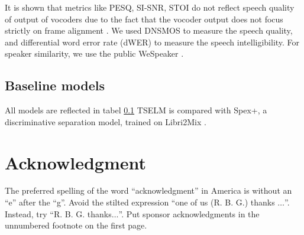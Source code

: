 \documentclass[conference]{IEEEtran}
\begin{document}
It is shown that metrics like PESQ, SI-SNR, STOI do not reflect speech quality of output of 
vocoders due to the fact that the vocoder output does not focus strictly on frame alignment
\cite{tokensplit,selm}. We used DNSMOS \cite{dnsmos} to measure the speech quality, and differential 
word error 
rate (dWER) \cite{dwer} to measure the speech intelligibility. For speaker similarity, we use the 
public WeSpeaker \cite{wespeaker}.


\subsection{Baseline models}
All models are reflected in tabel \ref{}
TSELM is compared with Spex+, a discriminative separation model, \cite{spex_plus} trained on Libri2Mix \cite{librimix}. 



\section*{Acknowledgment}

The preferred spelling of the word ``acknowledgment'' in America is without 
an ``e'' after the ``g''. Avoid the stilted expression ``one of us (R. B. 
G.) thanks $\ldots$''. Instead, try ``R. B. G. thanks$\ldots$''. Put sponsor 
acknowledgments in the unnumbered footnote on the first page.



\end{document}
